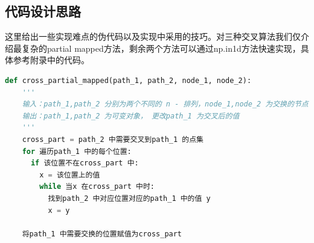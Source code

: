 \documentclass[12pt]{article}
\begin{document}
\subsection{代码设计思路}
这里给出一些实现难点的伪代码以及实现中采用的技巧。对三种交叉算法我们仅介绍最复杂的partial mapped方法，剩余两个方法可以通过np.in1d方法快速实现，具体参考附录中的代码。
\begin{lstlisting}[language = Python, caption = partial-mapped 方法实现交叉]
  def cross_partial_mapped(path_1, path_2, node_1, node_2):
    '''
    输入：path_1,path_2 分别为两个不同的 n - 排列，node_1,node_2 为交换的节点位置
    输出：path_1,path_2 为可变对象， 更改path_1 为交叉后的值
    '''
    cross_part = path_2 中需要交叉到path_1 的点集
    for 遍历path_1 中的每个位置:
      if 该位置不在cross_part 中:
        x = 该位置上的值 
        while 当x 在cross_part 中时:
          找到path_2 中对应位置对应的path_1 中的值 y
          x = y

    将path_1 中需要交换的位置赋值为cross_part
\end{lstlisting}




\end{document}
